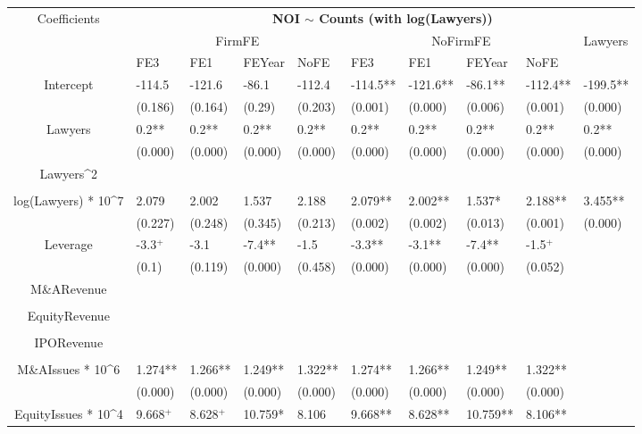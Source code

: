\documentclass{article}
\begin{document}
\begin{table}[H]
\centering
\begin{tabular}{|clllllllll|}
\hline
\multirow{3}{*}{Coefficients} & \multicolumn{9}{c|}{\textbf{NOI $\sim$ Counts (with log(Lawyers))}} \\
\cline{2-10}
& \multicolumn{4}{c}{FirmFE} & \multicolumn{4}{c}{NoFirmFE} & \multirow{2}{*}{Lawyers} \\
\cline{2-9}
& FE3 & FE1 & FEYear & NoFE & FE3 & FE1 & FEYear & NoFE &  \\
\hline
 
Intercept & -114.5 & -121.6 & -86.1 & -112.4 & -114.5** & -121.6** & -86.1** & -112.4** & -199.5** \\ 
   & (0.186) & (0.164) & (0.29) & (0.203) & (0.001) & (0.000) & (0.006) & (0.001) & (0.000) \\ 
  Lawyers & 0.2** & 0.2** & 0.2** & 0.2** & 0.2** & 0.2** & 0.2** & 0.2** & 0.2** \\ 
   & (0.000) & (0.000) & (0.000) & (0.000) & (0.000) & (0.000) & (0.000) & (0.000) & (0.000) \\ 
  Lawyers^2 &  &  &  &  &  &  &  &  &  \\ 
   &  &  &  &  &  &  &  &  &  \\ 
  log(Lawyers) * 10^7 & 2.079 & 2.002 & 1.537 & 2.188 & 2.079** & 2.002** & 1.537* & 2.188** & 3.455** \\ 
   & (0.227) & (0.248) & (0.345) & (0.213) & (0.002) & (0.002) & (0.013) & (0.001) & (0.000) \\ 
  Leverage & -3.3$^{+}$ & -3.1 & -7.4** & -1.5 & -3.3** & -3.1** & -7.4** & -1.5$^{+}$ &  \\ 
   & (0.1) & (0.119) & (0.000) & (0.458) & (0.000) & (0.000) & (0.000) & (0.052) &  \\ 
  M\&ARevenue &  &  &  &  &  &  &  &  &  \\ 
   &  &  &  &  &  &  &  &  &  \\ 
  EquityRevenue &  &  &  &  &  &  &  &  &  \\ 
   &  &  &  &  &  &  &  &  &  \\ 
  IPORevenue &  &  &  &  &  &  &  &  &  \\ 
   &  &  &  &  &  &  &  &  &  \\ 
  M\&AIssues * 10^6 & 1.274** & 1.266** & 1.249** & 1.322** & 1.274** & 1.266** & 1.249** & 1.322** &  \\ 
   & (0.000) & (0.000) & (0.000) & (0.000) & (0.000) & (0.000) & (0.000) & (0.000) &  \\ 
  EquityIssues * 10^4 & 9.668$^{+}$ & 8.628$^{+}$ & 10.759* & 8.106 & 9.668** & 8.628** & 10.759** & 8.106** &  \\ 

\end{tabular}
\end{table}
\end{document}
